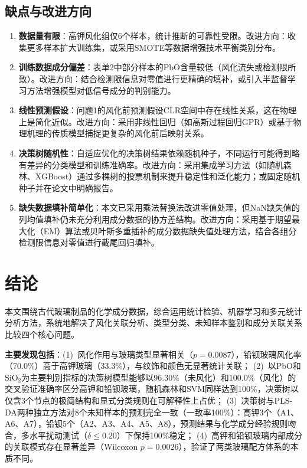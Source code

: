 \documentclass[12pt,a4paper]{ctexart}
\begin{document}
\subsection{缺点与改进方向}

\begin{enumerate}[label=(\arabic*), leftmargin=*]
    \item \textbf{数据量有限}：高钾风化组仅6个样本，统计推断的可靠性受限。改进方向：收集更多样本扩大训练集，或采用SMOTE等数据增强技术平衡类别分布。
    \item \textbf{训练数据成分偏差}：表单2中部分样本的PbO含量较低（风化流失或检测限所致）。改进方向：结合检测限信息对零值进行更精确的填补，或引入半监督学习方法增强模型对低信号成分的判别能力。
    \item \textbf{线性预测假设}：问题1的风化前预测假设CLR空间中存在线性关系，这在物理上是简化近似。改进方向：采用非线性回归（如高斯过程回归GPR）或基于物理机理的传质模型捕捉更复杂的风化前后映射关系。
    \item \textbf{决策树随机性}：自适应优化的决策树结果依赖随机种子，不同运行可能得到略有差异的分类模型和训练准确率。改进方向：采用集成学习方法（如随机森林、XGBoost）通过多棵树的投票机制来提升稳定性和泛化能力；或固定随机种子并在论文中明确报告。
    \item \textbf{缺失数据填补简单化}：本文已采用乘法替换法改进零值处理，但NaN缺失值的列均值填补仍未充分利用成分数据的协方差结构。改进方向：采用基于期望最大化（EM）算法或贝叶斯多重插补的成分数据缺失值处理方法\cite{11}，结合各组分检测限信息对零值进行截尾回归填补。
\end{enumerate}

\section{结论}

本文围绕古代玻璃制品的化学成分数据，综合运用统计检验、机器学习和多元统计分析方法，系统地解决了风化关联分析、类型分类、未知样本鉴别和成分关联关系比较四个核心问题。

\textbf{主要发现包括}：(1)~风化作用与玻璃类型显著相关（$p=0.0087$），铅钡玻璃风化率（70.0\%）高于高钾玻璃（33.3\%），与纹饰和颜色无显著统计关联；
(2)~以PbO和SiO$_2$为主要判别指标的决策树模型能够以96.30\%（未风化）和100.0\%（风化）的交叉验证准确率区分高钾和铅钡玻璃，随机森林和SVM同样达到100\%，决策树以仅含3个节点的极简结构和显式分类规则在可解释性上占优；
(3)~决策树与PLS-DA两种独立方法对8个未知样本的预测完全一致（一致率100\%）：高钾3个（A1、A6、A7），铅钡5个（A2、A3、A4、A5、A8），预测结果与化学成分经验规则吻合，多水平扰动测试（$\delta\le0.20$）下保持100\%稳定；
(4)~高钾和铅钡玻璃内部成分的关联模式存在显著差异（Wilcoxon $p=0.0026$），验证了两类玻璃配方体系的本质不同。
\end{document}
